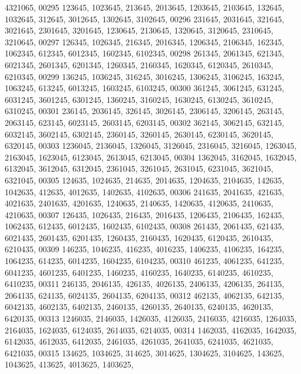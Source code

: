 \begin{DoxyCode}
      4321065,
00295        123645, 1023645,  213645, 2013645, 1203645, 2103645,  132645, 1032645,  312645, 3012645, 1302645, 
      3102645,
00296        231645, 2031645,  321645, 3021645, 2301645, 3201645, 1230645, 2130645, 1320645, 3120645, 2310645, 
      3210645,
00297        126345, 1026345,  216345, 2016345, 1206345, 2106345,  162345, 1062345,  612345, 6012345, 1602345, 
      6102345,
00298        261345, 2061345,  621345, 6021345, 2601345, 6201345, 1260345, 2160345, 1620345, 6120345, 2610345, 
      6210345,
00299        136245, 1036245,  316245, 3016245, 1306245, 3106245,  163245, 1063245,  613245, 6013245, 1603245, 
      6103245,
00300        361245, 3061245,  631245, 6031245, 3601245, 6301245, 1360245, 3160245, 1630245, 6130245, 3610245, 
      6310245,
00301        236145, 2036145,  326145, 3026145, 2306145, 3206145,  263145, 2063145,  623145, 6023145, 2603145, 
      6203145,
00302        362145, 3062145,  632145, 6032145, 3602145, 6302145, 2360145, 3260145, 2630145, 6230145, 3620145, 
      6320145,
00303       1236045, 2136045, 1326045, 3126045, 2316045, 3216045, 1263045, 2163045, 1623045, 6123045, 2613045, 
      6213045,
00304       1362045, 3162045, 1632045, 6132045, 3612045, 6312045, 2361045, 3261045, 2631045, 6231045, 3621045, 
      6321045,
00305        124635, 1024635,  214635, 2014635, 1204635, 2104635,  142635, 1042635,  412635, 4012635, 1402635, 
      4102635,
00306        241635, 2041635,  421635, 4021635, 2401635, 4201635, 1240635, 2140635, 1420635, 4120635, 2410635, 
      4210635,
00307        126435, 1026435,  216435, 2016435, 1206435, 2106435,  162435, 1062435,  612435, 6012435, 1602435, 
      6102435,
00308        261435, 2061435,  621435, 6021435, 2601435, 6201435, 1260435, 2160435, 1620435, 6120435, 2610435, 
      6210435,
00309        146235, 1046235,  416235, 4016235, 1406235, 4106235,  164235, 1064235,  614235, 6014235, 1604235, 
      6104235,
00310        461235, 4061235,  641235, 6041235, 4601235, 6401235, 1460235, 4160235, 1640235, 6140235, 4610235, 
      6410235,
00311        246135, 2046135,  426135, 4026135, 2406135, 4206135,  264135, 2064135,  624135, 6024135, 2604135, 
      6204135,
00312        462135, 4062135,  642135, 6042135, 4602135, 6402135, 2460135, 4260135, 2640135, 6240135, 4620135, 
      6420135,
00313       1246035, 2146035, 1426035, 4126035, 2416035, 4216035, 1264035, 2164035, 1624035, 6124035, 2614035, 
      6214035,
00314       1462035, 4162035, 1642035, 6142035, 4612035, 6412035, 2461035, 4261035, 2641035, 6241035, 4621035, 
      6421035,
00315        134625, 1034625,  314625, 3014625, 1304625, 3104625,  143625, 1043625,  413625, 4013625, 1403625, 

\end{DoxyCode}
